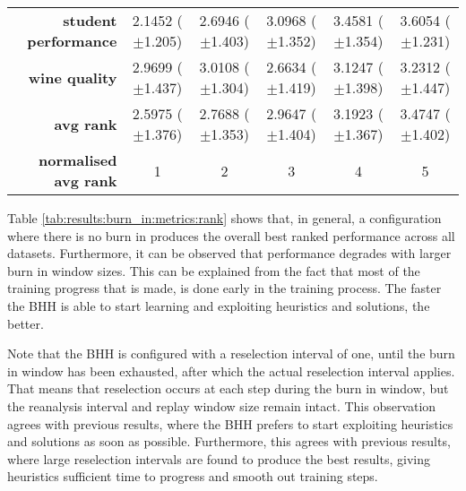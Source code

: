 \begin{table}[htb]
{\begin{tabular}{r|ccccc}
			\textbf{student performance} & \cellcolor[rgb]{ .388,  .745,  .482}2.1452 ($\pm$1.205) & \cellcolor[rgb]{ .741,  .843,  .502}2.6946 ($\pm$1.403) & \cellcolor[rgb]{ 1,  .922,  .518}3.0968 ($\pm$1.352)    & \cellcolor[rgb]{ .984,  .561,  .451}3.4581 ($\pm$1.354) & \cellcolor[rgb]{ .973,  .412,  .42}3.6054 ($\pm$1.231)  \\
			\textbf{wine quality}        & \cellcolor[rgb]{ .925,  .898,  .51}2.9699 ($\pm$1.437)  & \cellcolor[rgb]{ 1,  .922,  .518}3.0108 ($\pm$1.304)    & \cellcolor[rgb]{ .388,  .745,  .482}2.6634 ($\pm$1.419) & \cellcolor[rgb]{ .988,  .659,  .471}3.1247 ($\pm$1.398) & \cellcolor[rgb]{ .973,  .412,  .42}3.2312 ($\pm$1.447)  \\
			\midrule
			\textbf{avg rank}            & \cellcolor[rgb]{ .388,  .745,  .482}2.5975 ($\pm$1.376) & \cellcolor[rgb]{ .671,  .824,  .498}2.7688 ($\pm$1.353) & \cellcolor[rgb]{ 1,  .922,  .518}2.9647 ($\pm$1.404)    & \cellcolor[rgb]{ .988,  .694,  .475}3.1923 ($\pm$1.367) & \cellcolor[rgb]{ .973,  .412,  .42}3.4747 ($\pm$1.402)  \\
			\midrule
			\textbf{normalised avg rank} & \cellcolor[rgb]{ .388,  .745,  .482}1                   & \cellcolor[rgb]{ .694,  .831,  .498}2                   & \cellcolor[rgb]{ 1,  .922,  .518}3                      & \cellcolor[rgb]{ .988,  .667,  .471}4                   & \cellcolor[rgb]{ .973,  .412,  .42}5                    \\
		\end{tabular}%
	}
\end{table}%

Table \ref{tab:results:burn_in:metrics:rank} shows that, in general, a configuration where there is no burn in produces the overall best ranked performance across all datasets. Furthermore, it can be observed that performance degrades with larger burn in window sizes. This can be explained from the fact that most of the training progress that is made, is done early in the training process. The faster the \acs{BHH} is able to start learning and exploiting heuristics and solutions, the better.

Note that the \acs{BHH} is configured with a reselection interval of one, until the burn in window has been exhausted, after which the actual reselection interval applies. That means that reselection occurs at each step during the burn in window, but the reanalysis interval and replay window size remain intact. This observation agrees with previous results, where the \acs{BHH} prefers to start exploiting heuristics and solutions as soon as possible. Furthermore, this agrees with previous results, where large reselection intervals are found to produce the best results, giving heuristics sufficient time to progress and smooth out training steps.

